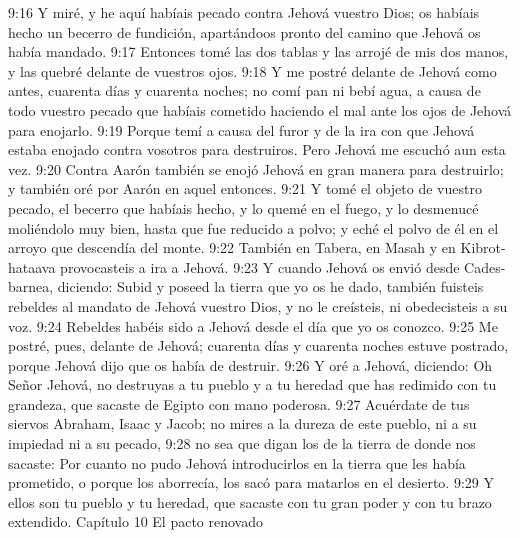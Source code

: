 9:16 Y miré, y he aquí habíais pecado contra Jehová vuestro Dios; os habíais hecho un becerro de fundición, apartándoos pronto del camino que Jehová os había mandado.  
9:17 Entonces tomé las dos tablas y las arrojé de mis dos manos, y las quebré delante de vuestros ojos.  
9:18 Y me postré delante de Jehová como antes, cuarenta días y cuarenta noches; no comí pan ni bebí agua, a causa de todo vuestro pecado que habíais cometido haciendo el mal ante los ojos de Jehová para enojarlo. 
9:19 Porque temí a causa del furor y de la ira con que Jehová estaba enojado contra vosotros para destruiros. Pero Jehová me escuchó aun esta vez.  
9:20 Contra Aarón también se enojó Jehová en gran manera para destruirlo; y también oré por Aarón en aquel entonces.  
9:21 Y tomé el objeto de vuestro pecado, el becerro que habíais hecho, y lo quemé en el fuego, y lo desmenucé moliéndolo muy bien, hasta que fue reducido a polvo; y eché el polvo de él en el arroyo que descendía del monte.  
9:22 También en Tabera, en Masah y en Kibrot-hataava  provocasteis a ira a Jehová.  
9:23 Y cuando Jehová os envió desde Cades-barnea, diciendo: Subid y poseed la tierra que yo os he dado, también fuisteis rebeldes al mandato de Jehová vuestro Dios, y no le creísteis, ni obedecisteis a su voz.  
9:24 Rebeldes habéis sido a Jehová desde el día que yo os conozco.  
9:25 Me postré, pues, delante de Jehová; cuarenta días y cuarenta noches estuve postrado, porque Jehová dijo que os había de destruir.  
9:26 Y oré a Jehová, diciendo: Oh Señor Jehová, no destruyas a tu pueblo y a tu heredad que has redimido con tu grandeza, que sacaste de Egipto con mano poderosa.  
9:27 Acuérdate de tus siervos Abraham, Isaac y Jacob; no mires a la dureza de este pueblo, ni a su impiedad ni a su pecado,  
9:28 no sea que digan los de la tierra de donde nos sacaste: Por cuanto no pudo Jehová introducirlos en la tierra que les había prometido, o porque los aborrecía, los sacó para matarlos en el desierto.  
9:29 Y ellos son tu pueblo y tu heredad, que sacaste con tu gran poder y con tu brazo extendido.  
Capítulo 10
El pacto renovado  

